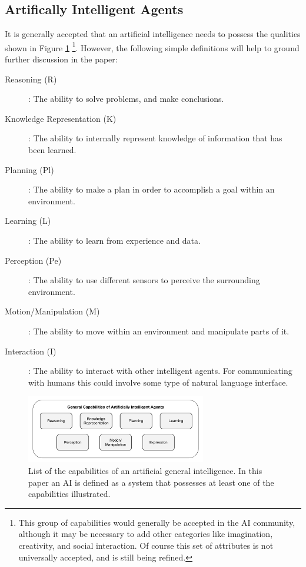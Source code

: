 \subsection{Artifically Intelligent Agents}
    It is generally accepted that an artificial intelligence needs to possess the qualities shown in Figure \ref{fig:AIcapabilities} \cite{Russell2010-wv,Nilsson2009-rp,Luger2008-vf}\footnote{This group of capabilities would generally be accepted in the AI community, although it may be necessary to add other categories like imagination, creativity, and social interaction. Of course this set of attributes is not universally accepted, and is still being refined.}. However, the following simple definitions will help to ground further discussion in the paper:

    \begin{description}
        \item [Reasoning (R)]: The ability to solve problems, and make conclusions.
        \item [Knowledge Representation (K)]: The ability to internally represent knowledge of information that has been learned.
        \item [Planning (Pl)]: The ability to make a plan in order to accomplish a goal within an environment.
        \item [Learning (L)]: The ability to learn from experience and data.
        \item [Perception (Pe)]: The ability to use different sensors to perceive the surrounding environment.
        \item [Motion/Manipulation (M)]: The ability to move within an environment and manipulate parts of it.
        \item [Interaction (I)]: The ability to interact with other intelligent agents. For communicating with humans this could involve some type of natural language interface.
    \end{description}

	\begin{figure}[htbp]
    	\centering
     	\includegraphics[width=0.7\textwidth]{Figures/AI_capabilities}
    	\caption{List of the capabilities of an artificial general intelligence. In this paper an AI is defined as a system that possesses at least one of the capabilities illustrated.}
        \label{fig:AIcapabilities}
    \end{figure}

